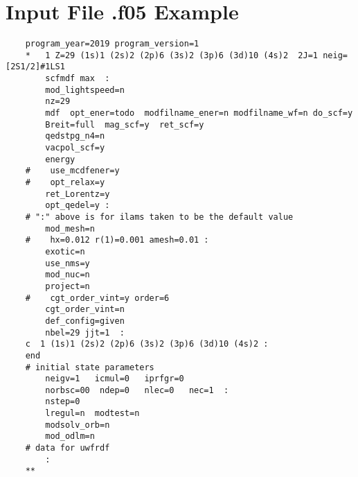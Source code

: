 
%


\chapter{Input File .f05 Example}\label{an:input}

\begin{lstlisting}
    program_year=2019 program_version=1
    *   1 Z=29 (1s)1 (2s)2 (2p)6 (3s)2 (3p)6 (3d)10 (4s)2  2J=1 neig=[2S1/2]#1LS1
        scfmdf max  :
        mod_lightspeed=n
        nz=29
        mdf  opt_ener=todo  modfilname_ener=n modfilname_wf=n do_scf=y     
        Breit=full  mag_scf=y  ret_scf=y
        qedstpg_n4=n
        vacpol_scf=y
        energy
    #    use_mcdfener=y
    #    opt_relax=y                                                         
        ret_Lorentz=y
        opt_qedel=y :
    # ":" above is for ilams taken to be the default value
        mod_mesh=n
    #    hx=0.012 r(1)=0.001 amesh=0.01 :
        exotic=n
        use_nms=y
        mod_nuc=n
        project=n
    #    cgt_order_vint=y order=6
        cgt_order_vint=n
        def_config=given
        nbel=29 jjt=1  :
    c  1 (1s)1 (2s)2 (2p)6 (3s)2 (3p)6 (3d)10 (4s)2 :
    end
    # initial state parameters
        neigv=1   icmul=0   iprfgr=0
        norbsc=00  ndep=0   nlec=0   nec=1  :
        nstep=0
        lregul=n  modtest=n
        modsolv_orb=n
        mod_odlm=n
    # data for uwfrdf
        :
    **
\end{lstlisting}